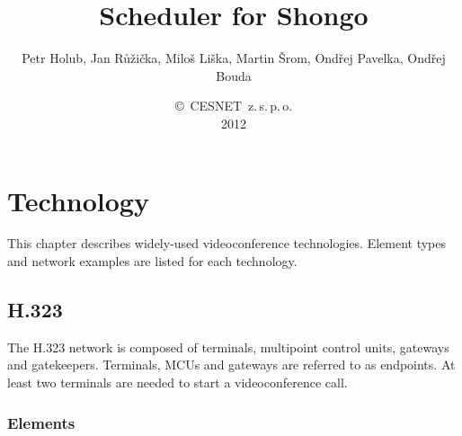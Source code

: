 \documentclass[a4paper]{report}
\begin{document}
\title{Scheduler for Shongo}
\author{Petr Holub, Jan Růžička, Miloš Liška, Martin Šrom, Ondřej Pavelka, Ondřej Bouda}
\date{\copyright~CESNET~z.\,s.\,p.\,o.\\2012}
\maketitle
\tableofcontents


\chapter{Technology}

This chapter describes widely-used videoconference technologies. Element types and network examples are listed  for each technology.


\section{H.323}

The H.323 network is composed of terminals, multipoint control units, gateways and gatekeepers. Terminals, MCUs and gateways are referred to as endpoints. At least two terminals are needed to start a videoconference call.

\subsection{Elements}
\end{document}
